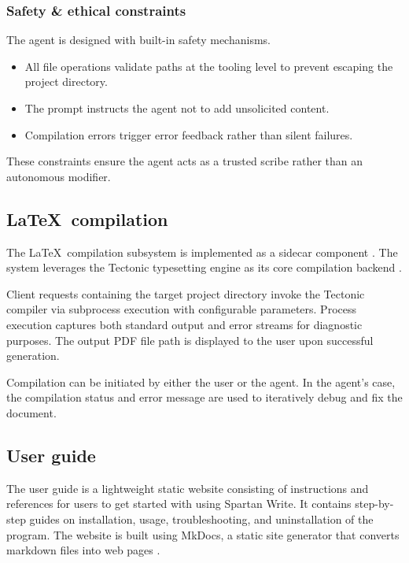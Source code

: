 \subsubsection{Safety \& ethical constraints}

The agent is designed with built-in safety mechanisms.

\begin{itemize}
    \item All file operations validate paths at the tooling level to prevent escaping the project directory.
    \item The prompt instructs the agent not to add unsolicited content.
    \item Compilation errors trigger error feedback rather than silent failures.
\end{itemize}
These constraints ensure the agent acts as a trusted scribe rather than an autonomous modifier.

\subsection{\LaTeX\ compilation}

The \LaTeX\ compilation subsystem is implemented as a sidecar component \cite{tauri_sidecar}.
The system leverages the Tectonic typesetting engine as its core compilation backend \cite{tectonic}.

Client requests containing the target project directory invoke the Tectonic compiler via subprocess execution with configurable parameters.
Process execution captures both standard output and error streams for diagnostic purposes.
The output PDF file path is displayed to the user upon successful generation.

Compilation can be initiated by either the user or the agent.
In the agent's case, the compilation status and error message are used to iteratively debug and fix the document.

\subsection{User guide}

The user guide is a lightweight static website consisting of instructions and references for users to get started with using Spartan Write.
It contains step-by-step guides on installation, usage, troubleshooting, and uninstallation of the program.
The website is built using MkDocs, a static site generator that converts markdown files into web pages \cite{mkdocs}.

